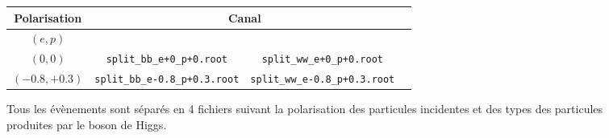 

\begin{figure}[!ht]
	\centering
	\begin{tabular}{ | c | c | c | c | }
		\hline
		Polarisation & \multicolumn{2}{c|}{Canal} \\
		\hline
		$(e,p)$ & \bb &  \WW \\
		\hline
		$(0,0)$ & \verb|split_bb_e+0_p+0.root| & \verb|split_ww_e+0_p+0.root| \\
		\hline \cline{2-3}
		$(-0.8, +0.3)$ & \verb|split_bb_e-0.8_p+0.3.root| & \verb|split_ww_e-0.8_p+0.3.root| \\
		\hline
	\end{tabular}
	\label{files:split}
	\caption{Tous les évènements sont séparés en 4 fichiers suivant la polarisation des particules incidentes et des types des particules produites par le boson de Higgs.}
\end{figure}